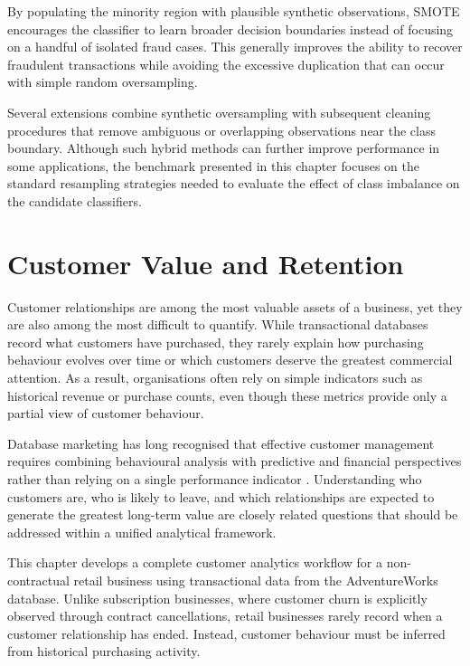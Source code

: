 \documentclass[
  12pt,
  letterpaper,
]{book}
\begin{document}
By populating the minority region with plausible synthetic observations,
SMOTE encourages the classifier to learn broader decision boundaries
instead of focusing on a handful of isolated fraud cases. This generally
improves the ability to recover fraudulent transactions while avoiding
the excessive duplication that can occur with simple random
oversampling.

Several extensions combine synthetic oversampling with subsequent
cleaning procedures that remove ambiguous or overlapping observations
near the class boundary. Although such hybrid methods can further
improve performance in some applications, the benchmark presented in
this chapter focuses on the standard resampling strategies needed to
evaluate the effect of class imbalance on the candidate classifiers.

\chapter{Customer Value and
Retention}\label{customer-value-and-retention}

Customer relationships are among the most valuable assets of a business,
yet they are also among the most difficult to quantify. While
transactional databases record what customers have purchased, they
rarely explain how purchasing behaviour evolves over time or which
customers deserve the greatest commercial attention. As a result,
organisations often rely on simple indicators such as historical revenue
or purchase counts, even though these metrics provide only a partial
view of customer behaviour.

Database marketing has long recognised that effective customer
management requires combining behavioural analysis with predictive and
financial perspectives rather than relying on a single performance
indicator . Understanding who
customers are, who is likely to leave, and which relationships are
expected to generate the greatest long-term value are closely related
questions that should be addressed within a unified analytical
framework.

This chapter develops a complete customer analytics workflow for a
non-contractual retail business using transactional data from the
AdventureWorks database. Unlike subscription businesses, where customer
churn is explicitly observed through contract cancellations, retail
businesses rarely record when a customer relationship has ended.
Instead, customer behaviour must be inferred from historical purchasing
activity.
\end{document}
